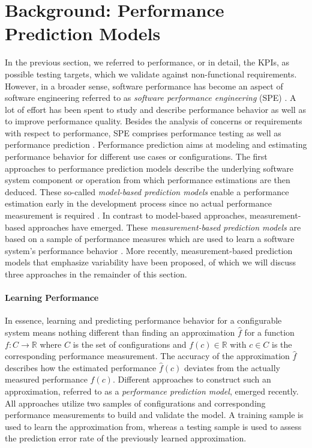 \section{Background: Performance Prediction
Models}\label{sec:performance_prediction_models} In the previous section, we referred to performance, or in detail, the KPIs, as
possible testing targets, which we validate against non-functional requirements.
However, in a broader sense, software performance has become an aspect of
software engineering referred to as \emph{software performance engineering}
(SPE) \citep{woodside_future_2007}.
A lot of effort has been spent to study and describe performance behavior as well
as to improve performance quality. Besides the analysis of concerns or
requirements with respect to performance, SPE comprises performance testing as
well as performance prediction \citep{woodside_future_2007}. Performance
prediction aims at modeling and estimating performance behavior for different
use cases or configurations. The first approaches to performance prediction
models describe the underlying software system component or operation from which
performance estimations are then deduced. These so-called \emph{model-based prediction models} enable a performance estimation early in the development process since no actual
performance measurement is required \citep{woodside_future_2007}. In contrast
to model-based approaches, measurement-based approaches have emerged. These \emph{measurement-based prediction models} are based on a sample of performance
measures which are used to learn a software system's performance behavior
\citep{woodside_future_2007}. More recently, measurement-based prediction models that emphasize variability have been
proposed, of which we will discuss three approaches in the remainder of
this section.

\paragraph{Learning Performance} In essence, learning and predicting
performance behavior for a configurable system means nothing different than finding an
approximation $\hat{f}$ for a function $f: C \rightarrow \mathbb{R}$ where $C$
is the set of configurations and $f(c) \in \mathbb{R}$ with $c \in C$ is the corresponding performance measurement. The
accuracy of the approximation $\hat{f}$ describes how the estimated performance
$\hat{f}(c)$ deviates from the actually measured performance $f(c)$. 
Different approaches to construct such an approximation, referred to as a
\emph{performance prediction model}, emerged recently. All approaches utilize
two samples of configurations and corresponding performance
measurements to build and validate the model. A training sample is used to
learn the approximation from, whereas a testing sample is used to assess the
prediction error rate of the previously learned approximation. 

